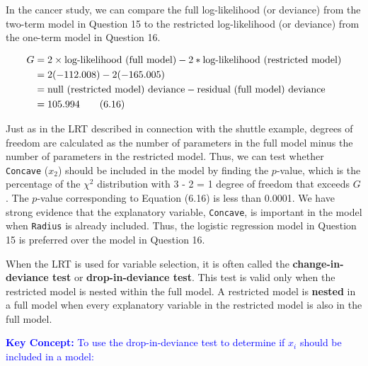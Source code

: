 \documentclass[
]{report}
\begin{document}
In the cancer study, we can compare the full log-likelihood (or deviance) from the two-term model in Question 15 to the restricted log-likelihood (or deviance) from the one-term model in Question 16.

\begin{align}
G &= 2 \times \text{log-likelihood (full model)} - 2 * \text{log-likelihood (restricted model)} \notag \\
&= 2(-112.008) - 2(-165.005) \notag \\
&= \text{null (restricted model) deviance} - \text{residual (full model) deviance} \notag \\
&= 105.994 \tag{6.16}
\end{align}

Just as in the LRT described in connection with the shuttle example, degrees of freedom are calculated as the number of parameters in the full model minus the number of parameters in the restricted model. Thus, we can test whether \texttt{Concave} (\(\scriptstyle x_2\)) should be included in the model by finding the \(\scriptstyle p\)-value, which is the percentage of the \(\scriptstyle \chi^2\) distribution with 3 - 2 = 1 degree of freedom that exceeds \(\scriptstyle G\). The \(\scriptstyle p\)-value corresponding to Equation (6.16) is less than 0.0001. We have strong evidence that the explanatory variable, \texttt{Concave}, is important in the model when \texttt{Radius} is already included. Thus, the logistic regression model in Question 15 is preferred over the model in Question 16.

When the LRT is used for variable selection, it is often called the \textbf{change-in-deviance test} or \textbf{drop-in-deviance test}. This test is valid only when the restricted model is nested within the full model. A restricted model is \textbf{nested} in a full model when every explanatory variable in the restricted model is also in the full model.

\begingroup
\linespread{0.9}\selectfont

\textbf{\textcolor{blue}{Key Concept:}} \textcolor{blue}{To use the drop-in-deviance test to determine if $\scriptstyle x_i$ should be included in a model:}
\end{document}
